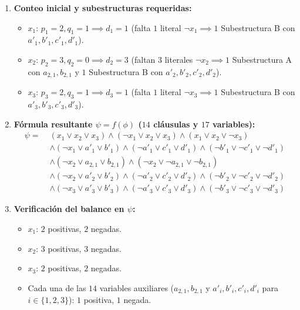 \begin{enumerate}[label=\arabic*., leftmargin=*]
    \item \textbf{Conteo inicial y subestructuras requeridas:}
    \begin{itemize}[leftmargin=*]
        \item $x_1$: $p_1 = 2, q_1 = 1 \implies d_1 = 1$ (falta $1$ literal $\neg x_1 \implies 1$ Subestructura B con $a'_1, b'_1, c'_1, d'_1$).
        \item $x_2$: $p_2 = 3, q_2 = 0 \implies d_2 = 3$ (faltan $3$ literales $\neg x_2 \implies 1$ Subestructura A con $a_{2,1}, b_{2,1}$ y $1$ Subestructura B con $a'_2, b'_2, c'_2, d'_2$).
        \item $x_3$: $p_3 = 2, q_3 = 1 \implies d_3 = 1$ (falta $1$ literal $\neg x_3 \implies 1$ Subestructura B con $a'_3, b'_3, c'_3, d'_3$).
    \end{itemize}

    \item \textbf{Fórmula resultante $\psi = f(\phi)$ ($14$ cláusulas y $17$ variables):}
    \[
    \begin{aligned}
    \psi =\;& (x_1 \lor x_2 \lor x_3) \land (\neg x_1 \lor x_2 \lor x_3) \land (x_1 \lor x_2 \lor \neg x_3) \\
    &\land (\neg x_1 \lor a'_1 \lor b'_1) \land (\neg a'_1 \lor c'_1 \lor d'_1) \land (\neg b'_1 \lor \neg c'_1 \lor \neg d'_1) \\
    &\land (\neg x_2 \lor a_{2,1} \lor b_{2,1}) \land (\neg x_2 \lor \neg a_{2,1} \lor \neg b_{2,1}) \\
    &\land (\neg x_2 \lor a'_2 \lor b'_2) \land (\neg a'_2 \lor c'_2 \lor d'_2) \land (\neg b'_2 \lor \neg c'_2 \lor \neg d'_2) \\
    &\land (\neg x_3 \lor a'_3 \lor b'_3) \land (\neg a'_3 \lor c'_3 \lor d'_3) \land (\neg b'_3 \lor \neg c'_3 \lor \neg d'_3)
    \end{aligned}
    \]

    \item \textbf{Verificación del balance en $\psi$:}
    \begin{itemize}[leftmargin=*]
        \item $x_1$: $2$ positivas, $2$ negadas.
        \item $x_2$: $3$ positivas, $3$ negadas.
        \item $x_3$: $2$ positivas, $2$ negadas.
        \item Cada una de las $14$ variables auxiliares ($a_{2,1}, b_{2,1}$ y $a'_i, b'_i, c'_i, d'_i$ para $i \in \{1, 2, 3\}$): $1$ positiva, $1$ negada.
    \end{itemize}
\end{enumerate}

